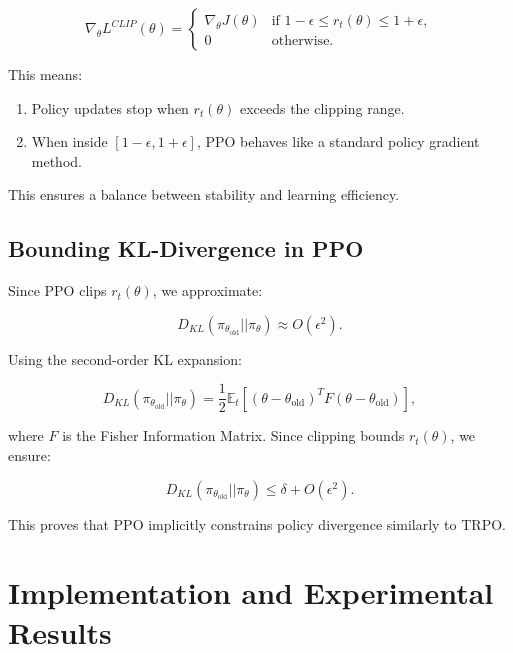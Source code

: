 \documentclass[12pt]{extreport} %
\begin{document}
\begin{equation}
\nabla_{\theta} L^{CLIP}(\theta) =
\begin{cases}
\nabla_{\theta} J(\theta) & \text{if } 1 - \epsilon \leq r_t(\theta) \leq 1 + \epsilon, \\
0 & \text{otherwise}.
\end{cases}
\end{equation}

This means:
\begin{enumerate}
    \item Policy updates stop when $r_t(\theta)$ exceeds the clipping range.
    \item When inside $[1 - \epsilon, 1 + \epsilon]$, PPO behaves like a standard policy gradient method.
\end{enumerate}

This ensures a balance between stability and learning efficiency.

\subsection{Bounding KL-Divergence in PPO}
Since PPO clips $r_t(\theta)$, we approximate:

\begin{equation}
D_{KL}(\pi_{\theta_{\text{old}}} || \pi_{\theta}) \approx O(\epsilon^2).
\end{equation}

Using the second-order KL expansion:

\begin{equation}
D_{KL}(\pi_{\theta_{\text{old}}} || \pi_{\theta}) = \frac{1}{2} \mathbb{E}_t \left[ (\theta - \theta_{\text{old}})^T F (\theta - \theta_{\text{old}}) \right],
\end{equation}

where $F$ is the Fisher Information Matrix. Since clipping bounds $r_t(\theta)$, we ensure:

\begin{equation}
D_{KL}(\pi_{\theta_{\text{old}}} || \pi_{\theta}) \leq \delta + O(\epsilon^2).
\end{equation}

This proves that PPO implicitly constrains policy divergence similarly to TRPO.


\section{\textbf{Implementation and Experimental Results}}
\end{document}
